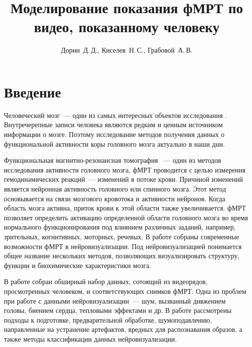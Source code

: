 \documentclass[12pt,twoside]{article}
\title
    [Моделирование показания фМРТ по видео, показанному человеку] %
    {Моделирование показания фМРТ по видео, показанному человеку}
\author
    [Дорин~Д.\,Д.] %
    {Дорин~Д.\,Д., Киселев~Н.\,С., Грабовой~А.\,В.} %
    [Дорин~Д.\,Д.$^{1,2}$, Грабовой~А.\,В.$^2$] %
\begin{document}
\maketitle
\section{Введение}
Человеческий мозг~--- один из самых интересных объектов исследования \citep{Zhumakova}. 
Внутречерепные записи человека являются редким и ценным источником информации о мозге.
Поэтому исследование методов получения данных о функциональной активности коры 
головного мозга актуально в наши дни.

Функциональная магнитно-резонансная томография \citep{Ushakov}~--- один из методов исследования активности головного мозга,
фМРТ проводится с целью измерения гемодинамических реакций~--- изменений в потоке крови. 
Причиной изменений является нейронная активность головного или спинного мозга.
Этот метод основывается на связи мозгового кровотока и активности нейронов. Когда область мозга активна, 
приток крови к этой области также увеличивается. 
фМРТ позволяет определить активацию определенной области головного мозга во время нормального функционирования под 
влиянием различных заданий, например, зрительных, когнитивных,  моторных,  речевых.
В работе \citep{Belyaevskaya2018} собраны современные возможности фМРТ в нейровизуализации. 
Под нейровизуализацией понимается общее название нескольких методов, позволяющих визуализировать структуру, функции и биохимические характеристики мозга.

В работе \citep{Berezutskaya2022} собран обширный набор данных, сотоящий из видеорядов, просмотренных 
человеком, и соответствующих снимков фМРТ. Одна из проблем при работе с данными нейровизуализации~--- шум, вызванный 
дивжением головы, биением сердца, тепловыми эффектами и др. 
В работе \citep{https://doi.org/10.48550/arxiv.1804.10167} рассмотрены подходы к подготовке,
предварительной обработке, шумоподавлению, направленные на устранение артефактов, вредных 
для распознавания образов, а также методы классификации данных нейровизуализации.
\end{document}
